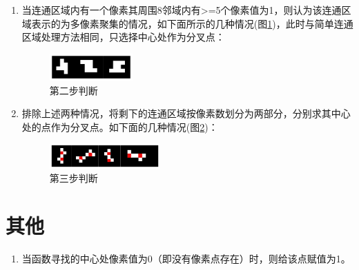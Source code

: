\documentclass[12pt]{article}
\begin{document}
\begin{enumerate}
\begin{enumerate}
\begin{enumerate}
\item 当连通区域内有一个像素其周围8邻域内有>=5个像素值为1，则认为该连通区域表示的为多像素聚集的情况，如下面所示的几种情况(图\ref{fig:complex3})，此时与简单连通区域处理方法相同，只选择中心处作为分叉点：
\begin{figure}[ht!]
\centering
\includegraphics[width=0.3\textwidth]{images/complex3}
\caption{第二步判断}
\label{fig:complex3}
\end{figure}
\item 排除上述两种情况，将剩下的连通区域按像素数划分为两部分，分别求其中心处的点作为分叉点。如下面的几种情况(图\ref{fig:complex4})：
\begin{figure}[ht!]
\centering
\includegraphics[width=0.4\textwidth]{images/complex4}
\caption{第三步判断}
\label{fig:complex4}
\end{figure}
\end{enumerate}
\end{enumerate}
\end{enumerate}

\section{其他}
\begin{enumerate}
\item 当函数寻找的中心处像素值为0（即没有像素点存在）时，则给该点赋值为1。
\end{enumerate}
\end{document}
